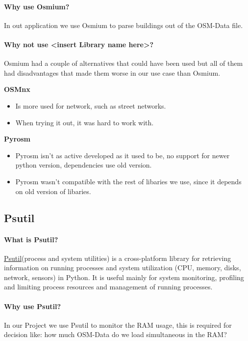 \documentclass[parskip=full]{report} %
\begin{document}
\paragraph{Why use Osmium?}
In out application we use Osmium to parse buildings out of the OSM-Data file.

\paragraph{Why not use <insert Library name here>?}
Osmium had a couple of alternatives that could have been used but all of them had disadvantages that made them worse in our use case than Osmium. 
  
\textbf{OSMnx}
\begin{itemize}
    \item Is more used for network, such as street networks. 
    \item When trying it out, it was hard to work with.
\end{itemize}


\textbf{Pyrosm}
\begin{itemize}
    \item Pyrosm isn't as active developed as it used to be, no support for newer python version, dependencies use old version.
    \item Pyrosm wasn't compatible with the rest of libaries we use, since it depends on old version of libaries.
\end{itemize}

\subsection{Psutil}
\paragraph{What is Psutil?}
\href{https://pypi.org/project/psutil/}{Psutil}(process and system utilities) is a cross-platform library for retrieving information on running processes and system utilization (CPU, memory, disks, network, sensors) in Python. It is useful mainly for system monitoring, profiling and limiting process resources and management of running processes. 

\paragraph{Why use Psutil?}
In our Project we use Psutil to monitor the RAM usage, this is required for decision like: how much OSM-Data do we load simultaneous in the RAM?
\end{document}
